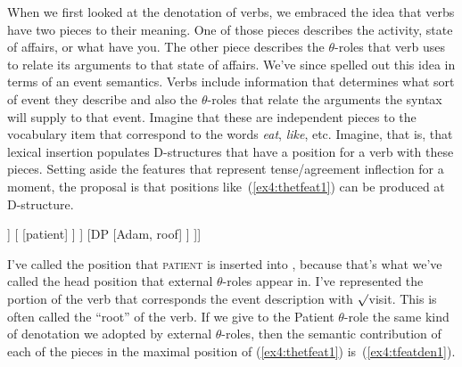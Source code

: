 When we first looked at the denotation of verbs, we embraced the idea that verbs have two pieces to their meaning. One of those pieces describes the activity, state of affairs, or what have you. The other piece describes the $\theta$-roles that verb uses to relate its arguments to that state of affairs. We've since spelled out this idea in terms of an event semantics. Verbs include information that determines what sort of event they describe and also the $\theta$-roles that relate the arguments the syntax will supply to that event. Imagine that these are independent pieces to the vocabulary item that correspond to the words \emph{eat}, \emph{like}, etc. Imagine, that is, that lexical insertion populates D-structures that have a position for a verb with these pieces. Setting aside the features that represent tense/agreement inflection for a moment, the proposal is that  positions like~(\ref{ex4:thetfeat1}) can be produced at D-structure.
\begin{exe}
	\raggedright
	\ex \label{ex4:thetfeat1} 
	\small
	\begin{forest}
	[VP[\ibar{V}
		[\obar{V} 
			[\obar{V} [$\surd$visit] ]
			[ [patient] ]
		]
		[DP [Adam, roof] ]
	]]
	\end{forest}
\end{exe}
I've called the  position that \textsc{patient} is inserted into , because that's what we've called the head position that external $\theta$-roles appear in. I've represented the portion of the verb that corresponds the event description with $\surd$visit. This is often called the ``root'' of the verb. If we give to the Patient $\theta$-role the same kind of denotation we adopted by external $\theta$-roles, then the semantic contribution of each of the pieces in the maximal  position of (\ref{ex4:thetfeat1}) is~(\ref{ex4:tfeatden1}).%
%
%

